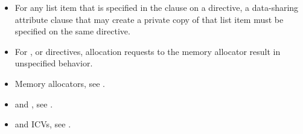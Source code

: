 \restrictions
\begin{itemize}
\item For any list item that is specified in the  clause on a directive, a data-sharing attribute clause that may create a private copy of that list item must be specified on the same directive.
\item For ,  or  directives, allocation requests to the  memory allocator result in unspecified behavior.
\end{itemize}

\crossreferences
\begin{itemize}
\item Memory allocators, see .
\item {} and , see .
\item {} and  ICVs, see .
\end{itemize}
